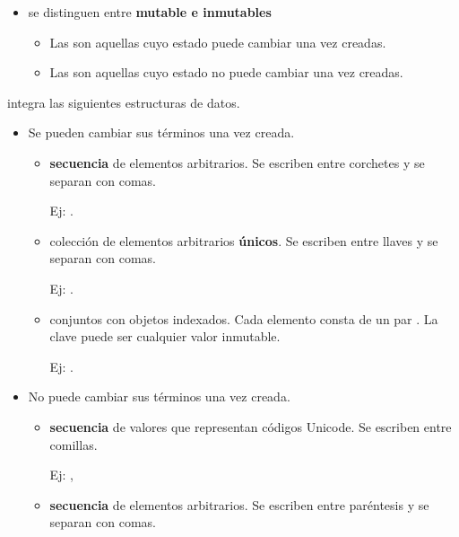 \begin{itemize}
\item {} se distinguen entre {\bf mutable e inmutables}
	\begin{itemize}
	\item Las  son aquellas cuyo estado puede cambiar una vez creadas.
	\item Las  son aquellas cuyo estado no puede cambiar una vez creadas.
	\end{itemize}
\end{itemize}



 integra las siguientes estructuras de datos.


\begin{itemize}

\item {} Se pueden cambiar sus términos una vez creada.

\begin{itemize}
\item {} \textbf{secuencia}  de elementos arbitrarios. Se escriben entre corchetes y se separan con comas.

Ej: \cm{[1, "hola", 3]}.

\item {} colección  de elementos arbitrarios \textbf{únicos}. Se escriben entre llaves y se separan con comas. 

Ej: .

\item {} conjuntos con objetos indexados. Cada elemento consta de un par . La clave puede ser cualquier valor inmutable. 

Ej: \cm{["\/a\/": 1, "b": "hola", "\/c": 3]}.
\end{itemize}


\item {} No puede cambiar sus términos una vez creada.

\begin{itemize}
\item {} \textbf{secuencia} de valores que representan códigos Unicode. Se escriben entre comillas. 

Ej: , 

\item {} \textbf{secuencia}  de elementos arbitrarios. Se escriben entre paréntesis y se separan con comas.  


\end{itemize}
\end{itemize}
